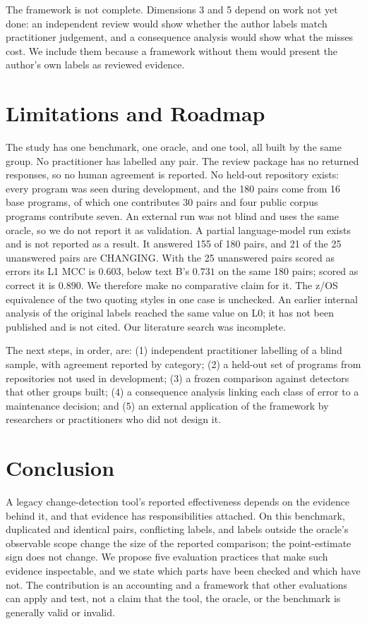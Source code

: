 \documentclass[conference]{IEEEtran}
\begin{document}
The framework is not complete. Dimensions 3 and 5 depend on work not yet done: an independent review would show whether the author labels match practitioner judgement, and a consequence analysis would show what the misses cost. We include them because a framework without them would present the author's own labels as reviewed evidence.

\section{Limitations and Roadmap}
\label{sec:limits}
The study has one benchmark, one oracle, and one tool, all built by the same group. No practitioner has labelled any pair. The review package has no returned responses, so no human agreement is reported. No held-out repository exists: every program was seen during development, and the 180 pairs come from 16 base programs, of which one contributes 30 pairs and four public corpus programs contribute seven. An external run was not blind and uses the same oracle, so we do not report it as validation. A partial language-model run exists and is not reported as a result. It answered 155 of 180 pairs, and 21 of the 25 unanswered pairs are CHANGING. With the 25 unanswered pairs scored as errors its L1 MCC is $0.603$, below text B's $0.731$ on the same 180 pairs; scored as correct it is $0.890$. We therefore make no comparative claim for it. The z/OS equivalence of the two quoting styles in one case is unchecked. An earlier internal analysis of the original labels reached the same value on L0; it has not been published and is not cited. Our literature search was incomplete.

The next steps, in order, are: (1) independent practitioner labelling of a blind sample, with agreement reported by category; (2) a held-out set of programs from repositories not used in development; (3) a frozen comparison against detectors that other groups built; (4) a consequence analysis linking each class of error to a maintenance decision; and (5) an external application of the framework by researchers or practitioners who did not design it.

\section{Conclusion}
A legacy change-detection tool's reported effectiveness depends on the evidence behind it, and that evidence has responsibilities attached. On this benchmark, duplicated and identical pairs, conflicting labels, and labels outside the oracle's observable scope change the size of the reported comparison; the point-estimate sign does not change. We propose five evaluation practices that make such evidence inspectable, and we state which parts have been checked and which have not. The contribution is an accounting and a framework that other evaluations can apply and test, not a claim that the tool, the oracle, or the benchmark is generally valid or invalid.



\end{document}
